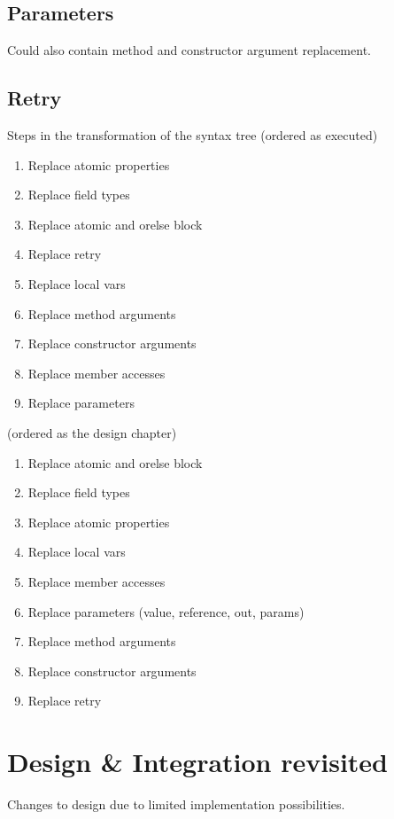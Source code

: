 \subsection{Parameters}
Could also contain method and constructor argument replacement.

\subsection{Retry}

Steps in the transformation of the syntax tree (ordered as executed)
\begin{enumerate}
	\item Replace atomic properties
	\item Replace field types
	\item Replace atomic and orelse block
	\item Replace retry
	\item Replace local vars
	\item Replace method arguments
	\item Replace constructor arguments
	\item Replace member accesses
	\item Replace parameters
\end{enumerate}

(ordered as the design chapter)
\begin{enumerate}
	\item Replace atomic and orelse block
	\item Replace field types
	\item Replace atomic properties
	\item Replace local vars
	\item Replace member accesses
	\item Replace parameters (value, reference, out, params)
	\item Replace method arguments
	\item Replace constructor arguments
	\item Replace retry
\end{enumerate}

\section{Design \& Integration revisited}
Changes to design due to limited implementation possibilities.
\worksheetend